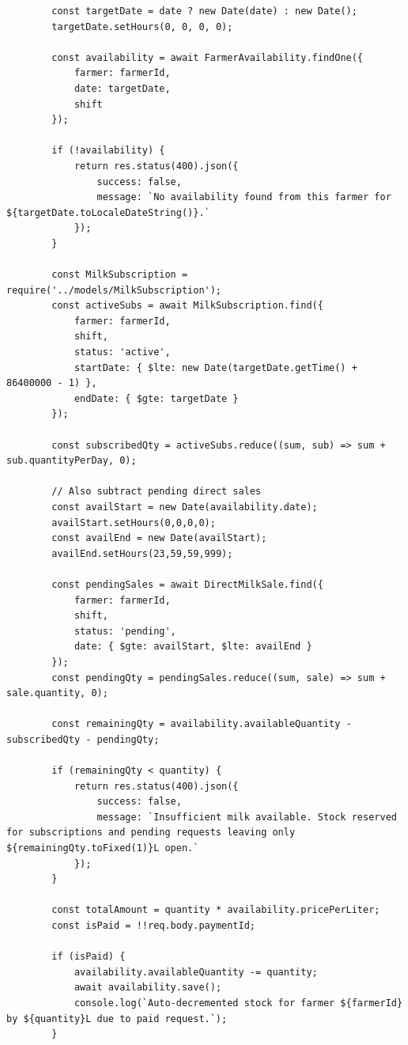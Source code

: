 \documentclass[12pt,a4paper]{report}
\begin{document}
\begin{lstlisting}
        const targetDate = date ? new Date(date) : new Date();
        targetDate.setHours(0, 0, 0, 0);

        const availability = await FarmerAvailability.findOne({
            farmer: farmerId,
            date: targetDate,
            shift
        });

        if (!availability) {
            return res.status(400).json({
                success: false,
                message: `No availability found from this farmer for ${targetDate.toLocaleDateString()}.`
            });
        }

        const MilkSubscription = require('../models/MilkSubscription');
        const activeSubs = await MilkSubscription.find({
            farmer: farmerId,
            shift,
            status: 'active',
            startDate: { $lte: new Date(targetDate.getTime() + 86400000 - 1) },
            endDate: { $gte: targetDate }
        });
        
        const subscribedQty = activeSubs.reduce((sum, sub) => sum + sub.quantityPerDay, 0);

        // Also subtract pending direct sales
        const availStart = new Date(availability.date);
        availStart.setHours(0,0,0,0);
        const availEnd = new Date(availStart);
        availEnd.setHours(23,59,59,999);

        const pendingSales = await DirectMilkSale.find({
            farmer: farmerId,
            shift,
            status: 'pending',
            date: { $gte: availStart, $lte: availEnd }
        });
        const pendingQty = pendingSales.reduce((sum, sale) => sum + sale.quantity, 0);

        const remainingQty = availability.availableQuantity - subscribedQty - pendingQty;

        if (remainingQty < quantity) {
            return res.status(400).json({
                success: false,
                message: `Insufficient milk available. Stock reserved for subscriptions and pending requests leaving only ${remainingQty.toFixed(1)}L open.`
            });
        }

        const totalAmount = quantity * availability.pricePerLiter;
        const isPaid = !!req.body.paymentId;

        if (isPaid) {
            availability.availableQuantity -= quantity;
            await availability.save();
            console.log(`Auto-decremented stock for farmer ${farmerId} by ${quantity}L due to paid request.`);
        }


\end{lstlisting}
\end{document}
